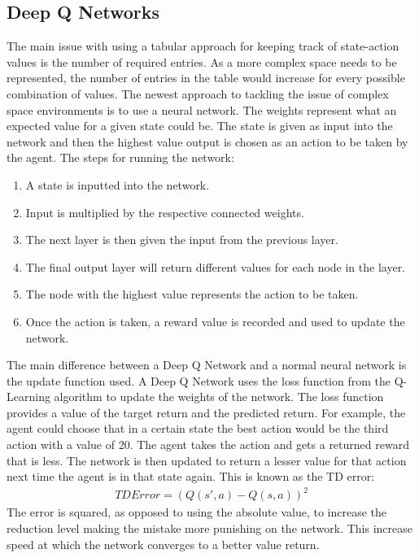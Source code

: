 \subsection{Deep Q Networks}
The main issue with using a tabular approach for keeping track of state-action values is the number of required entries. As a more complex space needs to be represented, the number of entries in the table would increase for every possible combination of values. The newest approach to tackling the issue of complex space environments is to use a neural network. The weights represent what an expected value for a given state could be. The state is given as input into the network and then the highest value output is chosen as an action to be taken by the agent. The steps for running the network:
\begin{enumerate}
\item A state is inputted into the network.
\item Input is multiplied by the respective connected weights.
\item The next layer is then given the input from the previous layer.
\item The final output layer will return different values for each node in the layer.
\item The node with the highest value represents the action to be taken.
\item Once the action is taken, a reward value is recorded and used to update the network.
\end{enumerate}
The main difference between a Deep Q Network and a normal neural network is the update function used. 
A Deep Q Network uses the loss function from the Q-Learning algorithm to update the weights of the network. The loss function provides a value of the target return and the predicted return. For example, the agent could choose that in a certain state the best action would be the third action with a value of 20. The agent takes the action and gets a returned reward that is less. The network is then updated to return a lesser value for that action next time the agent is in that state again. This is known as the TD error:
\begin{align}
TD Error = (Q(s',a) - Q(s,a))^{2}
\end{align}
The error is squared, as opposed to using the absolute value, to increase the reduction level making the mistake more punishing on the network. This increase speed at which the network converges to a better value return. 

